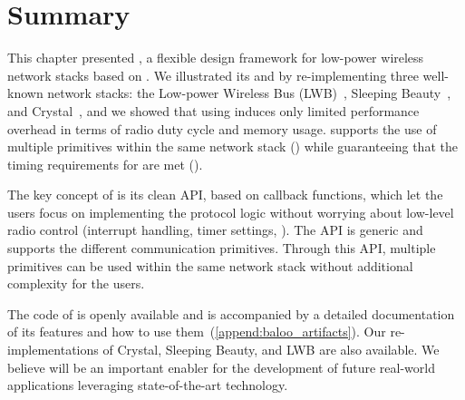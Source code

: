 
\section{Summary}

This chapter presented \baloo, a flexible design framework for low-power wireless network stacks based on \ST.
We illustrated its  and  by re-implementing three well-known network stacks: the Low-power Wireless Bus (LWB)~\cite{ferrari2012LWB}, Sleeping Beauty~\cite{sarkar2016Sleeping}, and Crystal~\cite{istomin2018Interferenceresilient}, and we showed that using \baloo induces only limited performance overhead in terms of radio duty cycle and memory usage.
\baloo supports the use of multiple \ST primitives within the same network stack () while guaranteeing that the timing requirements for \ST are met ().

The key concept of \baloo is its clean API, based on callback functions, which let the users focus on implementing the protocol logic without worrying about low-level radio control (interrupt handling, timer settings, \etc).
The API is generic and supports the different communication primitives. Through this API, multiple primitives can be used within the same network stack without additional complexity for the users.

The code of \baloo is openly available and is accompanied by a detailed documentation of its features and how to use them~(\cref{append:baloo_artifacts}).
Our re-implementations of Crystal, Sleeping Beauty, and LWB are also available.
We believe \baloo will be an important enabler for the development of future real-world applications leveraging state-of-the-art \ST technology.
